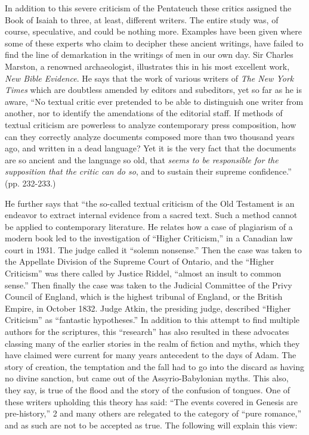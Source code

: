 In addition to this severe criticism of the Pentateuch these critics assigned the Book of Isaiah
to three, at least, different writers. The entire study was, of course, speculative, and could be
nothing more. Examples have been given where some of these experts who claim to decipher
these ancient writings, have failed to find the line of demarkation in the writings of men in
our own day. Sir Charles Marston, a renowned archaeologist, illustrates this in his most
excellent work, \textit{New Bible Evidence}. He says that the work of various writers of \textit{The New
York Times} which are doubtless amended by editors and subeditors, yet so far as he is aware,
``No textual critic ever pretended to be able to distinguish one writer from another, nor to
identify the amendations of the editorial staff. If methods of textual criticism are powerless to
analyze contemporary press composition, how can they correctly analyze documents
composed more than two thousand years ago, and written in a dead language? Yet it is the
very fact that the documents are so ancient and the language so old, that \textit{seems to be
responsible for the supposition that the critic can do so}, and to sustain their supreme
confidence.'' (pp. 232-233.)

He further says that ``the so-called textual criticism of the Old Testament is an endeavor to
extract internal evidence from a sacred text. Such a method cannot be applied to
contemporary literature. He relates how a case of plagiarism of a modern book led to the
investigation of ``Higher Criticism,'' in a Canadian law court in 1931. The judge called it
``solemn nonsense.'' Then the case was taken to the Appellate Division of the Supreme Court
of Ontario, and the ``Higher Criticism'' was there called by Justice Riddel, ``almost an insult to
common sense.'' Then finally the case was taken to the Judicial Committee of the Privy
Council of England, which is the highest tribunal of England, or the British Empire, in
October 1832. Judge Atkin, the presiding judge, described ``Higher Criticism'' as ``fantastic
hypotheses.'' In addition to this attempt to find multiple authors for the scriptures, this
``research'' has also resulted in these advocates classing many of the earlier stories in the
realm of fiction and myths, which they have claimed were current for many years antecedent
to the days of Adam. The story of creation, the temptation and the fall had to go into the
discard as having no divine sanction, but came out of the Assyrio-Babylonian myths. This
also, they say, is true of the flood and the story of the confusion of tongues. One of these
writers upholding this theory has said: ``The events covered in Genesis are pre-history,'' 2 and
many others are relegated to the category of ``pure romance,'' and as such are not to be
accepted as true. The following will explain this view:

